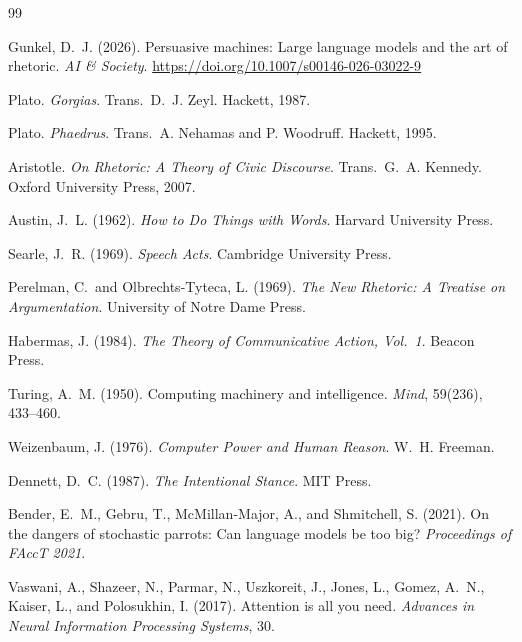 \documentclass[11pt, oneside]{article}
\begin{document}
\newpage
\begin{thebibliography}{99}

Gunkel, D.~J. (2026).
\newblock Persuasive machines: Large language models and the art of rhetoric.
\newblock \emph{AI \& Society}.
\newblock \url{https://doi.org/10.1007/s00146-026-03022-9}

Plato.
\newblock \emph{Gorgias}.
\newblock Trans.\ D.~J. Zeyl.
\newblock Hackett, 1987.

Plato.
\newblock \emph{Phaedrus}.
\newblock Trans.\ A. Nehamas and P. Woodruff.
\newblock Hackett, 1995.

Aristotle.
\newblock \emph{On Rhetoric: A Theory of Civic Discourse}.
\newblock Trans.\ G.~A. Kennedy.
\newblock Oxford University Press, 2007.

Austin, J.~L. (1962).
\newblock \emph{How to Do Things with Words}.
\newblock Harvard University Press.

Searle, J.~R. (1969).
\newblock \emph{Speech Acts}.
\newblock Cambridge University Press.

Perelman, C.\ and Olbrechts-Tyteca, L. (1969).
\newblock \emph{The New Rhetoric: A Treatise on Argumentation}.
\newblock University of Notre Dame Press.

Habermas, J. (1984).
\newblock \emph{The Theory of Communicative Action, Vol.~1}.
\newblock Beacon Press.

Turing, A.~M. (1950).
\newblock Computing machinery and intelligence.
\newblock \emph{Mind}, 59(236), 433--460.

Weizenbaum, J. (1976).
\newblock \emph{Computer Power and Human Reason}.
\newblock W.~H. Freeman.

Dennett, D.~C. (1987).
\newblock \emph{The Intentional Stance}.
\newblock MIT Press.

Bender, E.~M., Gebru, T., McMillan-Major, A., and Shmitchell, S. (2021).
\newblock On the dangers of stochastic parrots: Can language models be too big?
\newblock \emph{Proceedings of FAccT 2021}.

Vaswani, A., Shazeer, N., Parmar, N., Uszkoreit, J., Jones, L., Gomez, A.~N.,
  Kaiser, L., and Polosukhin, I. (2017).
\newblock Attention is all you need.
\newblock \emph{Advances in Neural Information Processing Systems}, 30.


\end{thebibliography}
\end{document}
